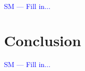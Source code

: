\documentclass[natbib,preprint]{sigplanconf}
\newcommand{\stephencomment}[1]{\textcolor{blue}{SM --- #1}}
\begin{document}
\stephencomment{Fill in...}

\section{Conclusion}

\stephencomment{Fill in...}




\end{document}
